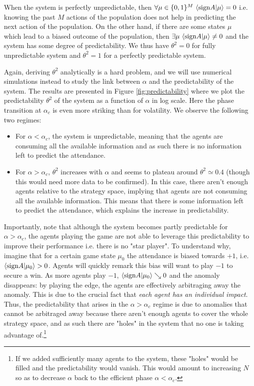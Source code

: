 \documentclass[a4paper, amsfonts, amssymb, amsmath, reprint, showkeys, nofootinbib, twoside]{revtex4-1}
\begin{document}
When the system is perfectly unpredictable, then $\forall \mu\in \{ 0,1\}^M \ \langle \textnormal{sign}A|\mu \rangle = 0$ i.e. knowing the past $M$ actions of the population does not help in predicting the next action of the population. On the other hand, if there are some states $\mu$ which lead to a biased outcome of the population, then $\exists \mu \ \langle \textnormal{sign}A|\mu \rangle \neq 0$ and the system has some degree of predictability. We thus have $\theta^2=0$ for fully unpredictable system and $\theta^2=1$ for a perfectly predictable system.

Again, deriving $\theta^2$ analytically is a hard problem, and we will use numerical simulations instead to study the link between $\alpha$ and the predictability of the system. The results are presented in Figure \ref{fig:predictability} where we plot the predictability $\theta^2$ of the system as a function of $\alpha$ in log scale. Here the phase transition at $\alpha_c$ is even more striking than for volatility. We observe the following two regimes:
\begin{itemize}
    \item For $\alpha < \alpha_c$, the system is unpredictable, meaning that the agents are consuming all the available information and as such there is no information left to predict the attendance.
    \item For $\alpha > \alpha_c$, $\theta^2$ increases with $\alpha$ and seems to plateau around $\theta^2 \simeq 0.4$ (though this would need more data to be confirmed). In this case, there aren't enough agents relative to the strategy space, implying that agents are not consuming all the available information. This means that there is some information left to predict the attendance, which explains the increase in predictability.
\end{itemize}
Importantly, note that although the system becomes partly predictable for $\alpha > \alpha_c$, the agents playing the game are not able to leverage this predictability to improve their performance i.e. there is no "star player". To understand why, imagine that for a certain game state $\mu_0$ the attendance is biased towards $+1$, i.e. $\langle \textnormal{sign}A|\mu_0 \rangle > 0$. Agents will quickly remark this bias will want to play $-1$ to secure a win. As more agents play $-1$, $\langle \textnormal{sign}A|\mu_0 \rangle \searrow 0$ and the anomaly disappears: by playing the edge, the agents are effectively arbitraging away the anomaly. This is due to the crucial fact that \textit{each agent has an individual impact}. Thus, the predictability that arises in the $\alpha > \alpha_c$ regime is due to anomalies that cannot be arbitraged away because there aren't enough agents to cover the whole strategy space, and as such there are "holes" in the system that no one is taking advantage of.\footnote{If we added sufficiently many agents to the system, these "holes" would be filled and the predictability would vanish. This would amount to increasing $N$ so as to decrease $\alpha$ back to the efficient phase $\alpha < \alpha_c$.}
\end{document}
